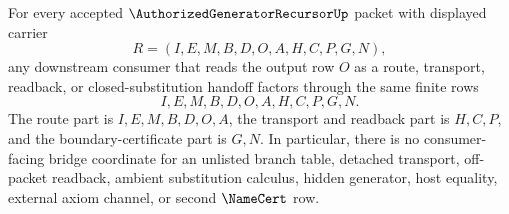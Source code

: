 \begin{lemma}
\label{lem:authorized-generator-recursor-output-readiness-bridge-determinacy}
For every accepted $\AuthorizedGeneratorRecursorUp$ packet with displayed carrier
$$
R=(I,E,M,B,D,O,A,H,C,P,G,N),
$$
any downstream consumer that reads the output row $O$ as a route, transport, readback, or closed-substitution handoff factors through the same finite rows
$$
I,E,M,B,D,O,A,H,C,P,G,N.
$$
The route part is $I,E,M,B,D,O,A$, the transport and readback part is $H,C,P$, and the boundary-certificate part is $G,N$. In particular, there is no consumer-facing bridge coordinate for an unlisted branch table, detached transport, off-packet readback, ambient substitution calculus, hidden generator, host equality, external axiom channel, or second $\NameCert$ row.
\end{lemma}
